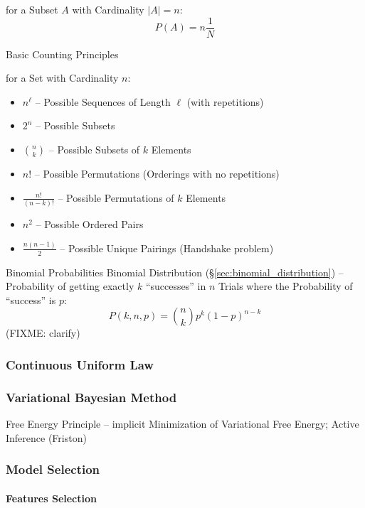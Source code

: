 for a Subset $A$ with Cardinality $|A| = n$:
\[
  P(A) = n \frac{1}{N}
\]


Basic Counting Principles

for a Set with Cardinality $n$:
\begin{itemize}
  \item $n^\ell$ -- Possible Sequences of Length $\ell$ (with repetitions)
  \item $2^n$ -- Possible Subsets
  \item $\binom{n}{k}$ -- Possible Subsets of $k$ Elements
  \item $n!$ -- Possible Permutations (Orderings with no repetitions)
  \item $\frac{n!}{(n-k)!}$ -- Possible Permutations of $k$ Elements
  \item $n^2$ -- Possible Ordered Pairs
  \item $\frac{n(n-1)}{2}$ -- Possible Unique Pairings (Handshake problem)
\end{itemize}


Binomial Probabilities \fist Binomial Distribution
(\S\ref{sec:binomial_distribution}) -- Probability of getting exactly $k$
``successes'' in $n$ Trials where the Probability of ``success'' is $p$:
\[
  P(k,n,p) = \binom{n}{k}p^k(1-p)^{n-k}
\]
(FIXME: clarify)



\subsubsection{Continuous Uniform Law}\label{sec:continuous_uniform_law}

\subsubsection{Variational Bayesian Method}
\label{sec:variational_bayesian_method}

Free Energy Principle -- implicit Minimization of Variational Free Energy;
Active Inference (Friston)



\subsubsection{Model Selection}\label{sec:model_selection}

\paragraph{Features Selection}\label{sec:feature_selection}\hfill


